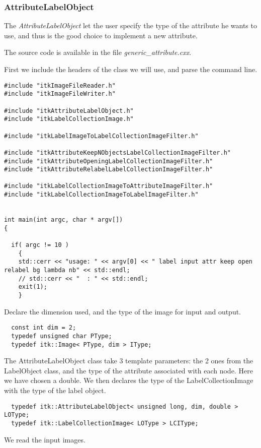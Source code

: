 \documentclass{InsightArticle}
\begin{document}
\subsubsection{AttributeLabelObject}

The {\em AttributeLabelObject} let the user specify the type of the attribute
he wants to use, and thus is the good choice to implement a new attribute.

The source code is available in the file {\em generic\_attribute.cxx}.

First we include the headers of the class we will use, and parse the command line.

\small \begin{verbatim}
#include "itkImageFileReader.h"
#include "itkImageFileWriter.h"

#include "itkAttributeLabelObject.h"
#include "itkLabelCollectionImage.h"

#include "itkLabelImageToLabelCollectionImageFilter.h"

#include "itkAttributeKeepNObjectsLabelCollectionImageFilter.h"
#include "itkAttributeOpeningLabelCollectionImageFilter.h"
#include "itkAttributeRelabelLabelCollectionImageFilter.h"

#include "itkLabelCollectionImageToAttributeImageFilter.h"
#include "itkLabelCollectionImageToLabelImageFilter.h"


int main(int argc, char * argv[])
{

  if( argc != 10 )
    {
    std::cerr << "usage: " << argv[0] << " label input attr keep open relabel bg lambda nb" << std::endl;
    // std::cerr << "  : " << std::endl;
    exit(1);
    }
\end{verbatim} \normalsize
Declare the dimension used, and the type of the image for input and output.
\small \begin{verbatim}
  const int dim = 2;
  typedef unsigned char PType;
  typedef itk::Image< PType, dim > IType;
\end{verbatim} \normalsize
The AttributeLabelObject class take 3 template parameters: the 2 ones
from the LabelObject class, and the type of the attribute associated
with each node. Here we have chosen a double. We then declares the
type of the LabelCollectionImage with the type of the label object.
\small \begin{verbatim}
  typedef itk::AttributeLabelObject< unsigned long, dim, double > LOType;
  typedef itk::LabelCollectionImage< LOType > LCIType;
\end{verbatim} \normalsize
We read the input images.
\end{document}
